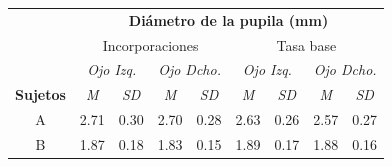 \begin{table}[htb]
\centering
\begin{tabular}{@{}cccccccccll@{}}
                                            & \multicolumn{10}{c}{\textbf{Diámetro de la pupila (mm)}}                                                                                                                                                                                                                                                                                  \\ \cmidrule(l){2-11} 
                                            & \multicolumn{4}{c|}{Incorporaciones}                                                                                                                                & \multicolumn{6}{c}{Tasa   base}                                                                                                                                     \\ \cmidrule(l){2-11} 
                                            & \multicolumn{2}{c|}{\textit{Ojo Izq.}}                                           & \multicolumn{2}{c|}{\textit{Ojo   Dcho.}}                                        & \multicolumn{2}{c}{\textit{Ojo   Izq.}}                                          & \multicolumn{4}{c}{\textit{Ojo   Dcho.}}                                         \\ \cmidrule(l){2-11} 
\multirow{-4}{*}{\textbf{Sujetos}} & \textit{M}                   & \multicolumn{1}{c|}{\textit{SD}}                  & \textit{M}                   & \multicolumn{1}{c|}{\textit{SD}}                  & \textit{M}                   & \multicolumn{1}{c|}{\textit{SD}}                  & \textit{M}                    & \multicolumn{3}{c}{\textit{SD}}                  \\ \cmidrule(l){2-11} 
{A}                                  & \cellcolor[HTML]{BDD6EE}2.71 & \multicolumn{1}{c|}{\cellcolor[HTML]{BDD6EE}0.30} & \cellcolor[HTML]{BDD6EE}2.70 & \multicolumn{1}{c|}{\cellcolor[HTML]{BDD6EE}0.28} & 2.63                         & \multicolumn{1}{c|}{0.26}                         & 2.57                          & \multicolumn{3}{c}{0.27}                         \\ \midrule
{B}                                  & 1.87                         & \multicolumn{1}{c|}{0.18}                         & 1.83                         & \multicolumn{1}{c|}{0.15}                         & \cellcolor[HTML]{BDD6EE}1.89 & \multicolumn{1}{c|}{\cellcolor[HTML]{BDD6EE}0.17} & \cellcolor[HTML]{BDD6EE}1.88  & \multicolumn{3}{c}{\cellcolor[HTML]{BDD6EE}0.16} \\ \midrule

\end{tabular}
\end{table}
